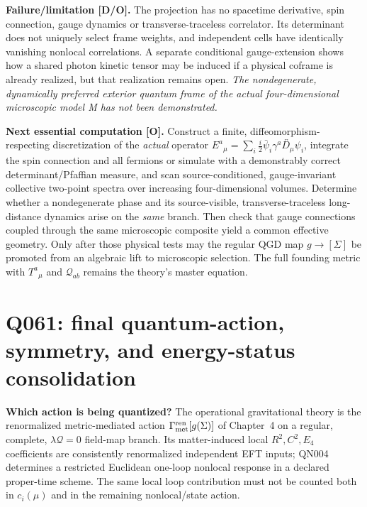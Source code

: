 \documentclass[11pt,a4paper]{article}
\begin{document}
\textbf{Failure/limitation [D/O].} The projection has no spacetime derivative, spin connection, gauge dynamics or transverse-traceless correlator. Its determinant does not uniquely select frame weights, and independent cells have identically vanishing nonlocal correlations. A separate conditional gauge-extension shows how a shared photon kinetic tensor may be induced if a physical coframe is already realized, but that realization remains open. \emph{The nondegenerate, dynamically preferred exterior quantum frame of the actual four-dimensional microscopic model M has not been demonstrated.}

\textbf{Next essential computation [O].} Construct a finite, diffeomorphism-respecting discretization of the \emph{actual} operator $E^a{}_{\mu}=\sum_i\frac i2\bar\psi_i\gamma^a\overleftrightarrow{D_\mu}\psi_i$, integrate the spin connection and all fermions or simulate with a demonstrably correct determinant/Pfaffian measure, and scan source-conditioned, gauge-invariant collective two-point spectra over increasing four-dimensional volumes. Determine whether a nondegenerate phase and its source-visible, transverse-traceless long-distance dynamics arise on the \emph{same} branch. Then check that gauge connections coupled through the same microscopic composite yield a common effective geometry. Only after those physical tests may the regular QGD map $g\to[\Sigma]$ be promoted from an algebraic lift to microscopic selection. The full founding metric with $T^a{}_{\mu}$ and $\mathcal Q_{ab}$ remains the theory's master equation.







\clearpage









\clearpage


\section{Q061: final quantum-action, symmetry, and energy-status consolidation}
\noindent\textbf{Which action is being quantized?} The operational gravitational theory is the renormalized metric-mediated action $\Gamma_{\rm met}^{\rm ren}[g(\Sigma)]$ of Chapter~4 on a regular, complete, $\lambda\mathcal Q=0$ field-map branch. Its matter-induced local $R^2,C^2,E_4$ coefficients are consistently renormalized independent EFT inputs; QN004 determines a restricted Euclidean one-loop nonlocal response in a declared proper-time scheme. The same local loop contribution must not be counted both in $c_i(\mu)$ and in the remaining nonlocal/state action.
\end{document}
